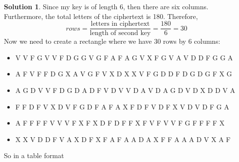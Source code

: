 \documentclass[11pt]{article}
\theoremstyle{definition}\newtheorem{definition}{Definition}
\theoremstyle{definition}\newtheorem{question}{Question}
\theoremstyle{definition}\newtheorem*{solution}{Solution}
\begin{document}
\begin{solution}
    Since my key is of length 6, then there are six columns. Furthermore, the total letters of the ciphertext is 180. Therefore,
    \begin{equation*}
        rows = \frac{\text{letters in ciphertext}}{\text{length of second key}} = \frac{180}{6} = 30
    \end{equation*}
    Now we need to create a rectangle where we have 30 rows by 6 columns: 
    \begin{itemize}
        \item V V F G V V F D G G V G F A F A G V X F G V A V D D F G G A 
        \item A F V F F D G X A V G F V X D X X V F G D D F D G D G F X G 
        \item A G D V V F D G D A D F V D V V D A V D A G D V D X D D V A 
        \item F F D F V X D V F G D F A F A X F D F V D F X V D V D F G A 
        \item A F F F F V V V F X F X D F D F F X F V F V V F G F F F F X 
        \item X X V D D F V A X D F X F A F A A D A X F F A A A D V X A F
    \end{itemize}
    So in a table format


\end{solution}
\end{document}
